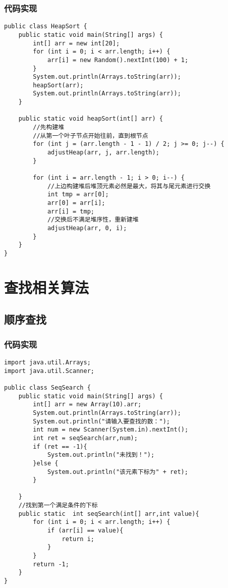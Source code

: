 \documentclass[a4paper]{report}
\begin{document}
\subsection{代码实现}
\begin{lstlisting}
public class HeapSort {
    public static void main(String[] args) {
        int[] arr = new int[20];
        for (int i = 0; i < arr.length; i++) {
            arr[i] = new Random().nextInt(100) + 1;
        }
        System.out.println(Arrays.toString(arr));
        heapSort(arr);
        System.out.println(Arrays.toString(arr));
    }

    public static void heapSort(int[] arr) {
        //先构建堆
        //从第一个叶子节点开始往前，直到根节点
        for (int j = (arr.length - 1 - 1) / 2; j >= 0; j--) {
            adjustHeap(arr, j, arr.length);
        }

        for (int i = arr.length - 1; i > 0; i--) {
            //上边构建堆后堆顶元素必然是最大，将其与尾元素进行交换
            int tmp = arr[0];
            arr[0] = arr[i];
            arr[i] = tmp;
            //交换后不满足堆序性，重新建堆
            adjustHeap(arr, 0, i);
        }
    }
}
\end{lstlisting}
\chapter{查找相关算法}
\section{顺序查找}
\subsection{代码实现}

\begin{lstlisting}
import java.util.Arrays;
import java.util.Scanner;

public class SeqSearch {
    public static void main(String[] args) {
        int[] arr = new Array(10).arr;
        System.out.println(Arrays.toString(arr));
        System.out.println("请输入要查找的数：");
        int num = new Scanner(System.in).nextInt();
        int ret = seqSearch(arr,num);
        if (ret == -1){
            System.out.println("未找到！");
        }else {
            System.out.println("该元素下标为" + ret);
        }

    }
    //找到第一个满足条件的下标
    public static  int seqSearch(int[] arr,int value){
        for (int i = 0; i < arr.length; i++) {
            if (arr[i] == value){
                return i;
            }
        }
        return -1;
    }
}
\end{lstlisting}
\end{document}
